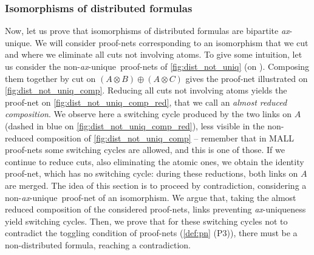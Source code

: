 \documentclass{lmcs}
\newcommand*{\tens}{\otimes} %
\newcommand*{\unique}{\textit{ax}-unique}
\begin{document}
\subsubsection{Isomorphisms of distributed formulas}
\label{subsubsec:proof_iso_bi_u}

Now, let us prove that isomorphisms of distributed formulas are bipartite \unique.
We will consider proof-nets corresponding to an isomorphism that we cut and where we eliminate all cuts not involving atoms.
To give some intuition, let us consider the non-\unique\ proof-nets of \autoref{fig:dist_not_uniq} (on ).
Composing them together by cut on $(A\tens B)\oplus(A\tens C)$ gives the proof-net illustrated on \autoref{fig:dist_not_uniq_comp}.
Reducing all cuts not involving atoms yields the proof-net on \autoref{fig:dist_not_uniq_comp_red}, that we call an \emph{almost reduced composition}.
We observe here a switching cycle produced by the two links on $A$ (dashed in blue on \autoref{fig:dist_not_uniq_comp_red}), less visible in the non-reduced composition of \autoref{fig:dist_not_uniq_comp} -- remember that in MALL proof-nets some switching cycles are allowed, and this is one of those.
If we continue to reduce cuts, also eliminating the atomic ones, we obtain the identity proof-net, which has no switching cycle: during these reductions, both links on $A$ are merged.
The idea of this section is to proceed by contradiction, considering a non-\unique\ proof-net of an isomorphism.
We argue that, taking the almost reduced composition of the considered proof-nets, links preventing \unique ness yield switching cycles.
Then, we prove that for these switching cycles not to contradict the toggling condition of proof-nets (\autoref{def:pn} (P3)), there must be a non-distributed formula, reaching a contradiction.
\end{document}
